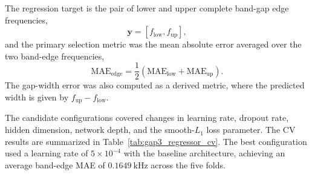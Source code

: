 The regression target is the pair of lower and upper complete band-gap edge frequencies,
\begin{equation}
    \mathbf{y}
    =
    \left[
    f_{\mathrm{low}},
    f_{\mathrm{up}}
    \right],
\end{equation}
and the primary selection metric was the mean absolute error averaged over the two band-edge frequencies,
\begin{equation}
    \mathrm{MAE}_{\mathrm{edge}}
    =
    \frac{1}{2}
    \left(
    \mathrm{MAE}_{\mathrm{low}}
    +
    \mathrm{MAE}_{\mathrm{up}}
    \right).
\end{equation}
The gap-width error was also computed as a derived metric, where the predicted width is given by $f_{\mathrm{up}}-f_{\mathrm{low}}$.

The candidate configurations covered changes in learning rate, dropout rate, hidden dimension, network depth, and the smooth-$L_1$ loss parameter. The CV results are summarized in Table~\ref{tab:gap3_regressor_cv}. The best configuration used a learning rate of $5\times10^{-4}$ with the baseline architecture, achieving an average band-edge MAE of $0.1649~\mathrm{kHz}$ across the five folds.

